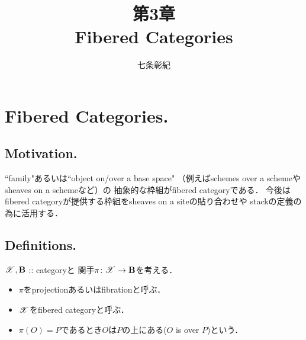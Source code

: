\documentclass[a4paper, dvipdfmx]{jsarticle}
\begin{document}
\title{第3章 \\ Fibered Categories}
\author{七条彰紀}
\maketitle
\tableofcontents
\vspace{10pt}

\section{Fibered Categories.}
\subsection{Motivation.}
    ``family"あるいは``object on/over a base space"
    （例えばschemes over a schemeやsheaves on a schemeなど）の
    抽象的な枠組がfibered categoryである．
    今後はfibered categoryが提供する枠組をsheaves on a siteの貼り合わせや
    stackの定義の為に活用する．

\subsection{Definitions.}
    $\mathscr{X}, \mathbf{B}$ :: categoryと
    関手$\pi \colon \mathscr{X} \to \mathbf{B}$を考える．
    \begin{itemize}
    \item 
        $\pi$をprojectionあるいはfibrationと呼ぶ．
    \item
        $\mathscr{X}$をfibered categoryと呼ぶ．
    \item
        $\pi(O)=P$であるとき$O$は$P$の上にある($O$ is over $P$)という．
    \end{itemize}
\end{document}
